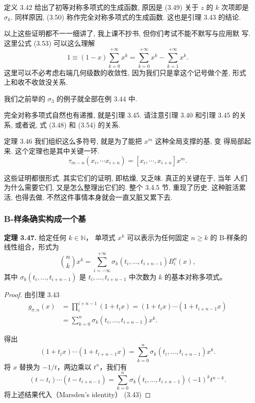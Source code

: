 \documentclass[a4paper]{ctexart}
\begin{document}
{定义 3.42 给出了初等对称多项式的生成函数, 原因是 (3.49) 关于 $z$ 的
$k$ 次项即是 $\sigma_k$. 同样原因, (3.50) 称作完全对称多项式的生成函数.
这也是引理 3.43 的结论.

以上这些证明都不一一细讲了, 我上课不抄书, 但你们考试不能不默写与应用默
写. 这里公式 (3.53) 可以这么理解
$$
1 \equiv (1 - x)\sum_{k = 0}^{+\infty} x^k = \sum_{k =
  0}^{+\infty}x^k - \sum_{k = 1}^{+\infty} x^k.
$$
这里可以不必考虑右端几何级数的收敛性, 因为我们只是拿这个记号做个差,
形式上和收不收敛没关系.

我们之前举的 $\sigma_3$ 的例子就全部在例 3.44 中.

完全对称多项式自然也有递推, 就是引理 3.45. 请注意引理 3.40 和引理 3.45 的关系, 或者说,
式 (3.48) 和 (3.54) 的关系.

定理 3.46 我们组织这么多符号, 就是为了能把 $x^m$ 这种全局支撑的基, 变
得局部起来. 这个定理也是其中关键一环.
$$
\tau_{m - n}(x_i, \cdots x_{i + n}) = [x_i, \cdots, x_{i + n}] x^m.
$$

这些证明都很形式. 其实它们的证明, 即枯燥, 又乏味. 真正的关键在于, 当年
人们为什么需要它们, 又是怎么整理出它们的. 整个 3.4.5 节, 重现了历史.
这种脏活累活, 也得去做. 不然这件事情本身就会一直又脏又累下去.

\subsubsection{B-样条确实构成一个基}

\noindent\textbf{定理 3.47.} 给定任何 $k \in \mathbb{N}$，
单项式 $x^{k}$ 可以表示为任何固定 $n \geq k$ 的 B-样条的线性组合，形式为
\[
\binom{n}{k} x^k 
= \sum_{i=-\infty}^{+\infty} 
\sigma_k(t_i, \ldots, t_{i+n-1}) B_i^n(x), \tag{3.58}
\]
其中 $\sigma_{k}(t_{i}, \ldots, t_{i+n-1})$ 是 
$t_{i}, \ldots, t_{i+n-1}$ 中次数为 $k$ 的基本对称多项式。

\begin{proof}
  由引理 3.43 
  \begin{align*}
    g_{\sigma, n}(x) &= \prod_{i}^{i + n - 1} (1 + t_i x) = (1 + t_i x) \cdots (1 + t_{i + n - 1} x) \\
    &= \sum_{k = 0}^n \sigma_k(t_i, \ldots, t_{i + n - 1}) x^k. 
  \end{align*}
  
  得出
  \[
  (1 + t_i x) \cdots (1 + t_{i+n-1} x) = \sum_{k=0}^n \sigma_k(t_i, \ldots, t_{i+n-1}) x^k.
  \]
  将 $x$ 替换为 $-1/t$，两边乘以 $t^{n}$，我们有
  \[
  (t - t_i) \cdots (t - t_{i+n-1}) = \sum_{k=0}^n \sigma_k(t_i, \ldots, t_{i+n-1})(-1)^k t^{n-k}.
  \]
  将上述结果代入（Marsden's identity） (3.43) 
  

\end{proof}}
\end{document}
